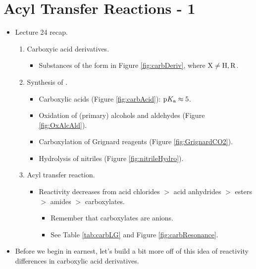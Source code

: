 \documentclass[../notes.tex]{subfiles}
\begin{document}
\section{Acyl Transfer Reactions - 1}
\begin{itemize}
    \item {}Lecture 24 recap.
    \begin{enumerate}
        \item Carboxyic acid derivatives.
        \begin{itemize}
            \item Substances of the form in Figure \ref{fig:carbDeriv}, where $\ce{X}\neq\ce{H},\ce{R}$.
        \end{itemize}
        \item Synthesis of .
        \begin{itemize}
            \item Carboxylic acids (Figure \ref{fig:carbAcid}): $\textup{p}K_\textup{a}\approx 5$.
            \item Oxidation of (primary) alcohols and aldehydes (Figure \ref{fig:OxAlcAld}).
            \item Carboxylation of Grignard reagents (Figure \ref{fig:GrignardCO2}).
            \item Hydrolysis of nitriles (Figure \ref{fig:nitrileHydro}).
        \end{itemize}
        \item Acyl transfer reaction.
        \begin{itemize}
            \item Reactivity decreases from acid chlorides $>$ acid anhydrides $>$ esters $>$ amides $>$ carboxylates.
            \begin{itemize}
                \item Remember that carboxylates are anions.
                \item See Table \ref{tab:carbLG} and Figure \ref{fig:carbResonance}.
            \end{itemize}
        \end{itemize}
    \end{enumerate}
    \item Before we begin in earnest, let's build a bit more off of this idea of reactivity differences in carboxylic acid derivatives.
    \begin{figure}[h!]
        \centering
        \footnotesize
        \begin{subfigure}[b]{0.49\linewidth}

\end{subfigure}
\end{figure}
\end{itemize}
\end{document}
